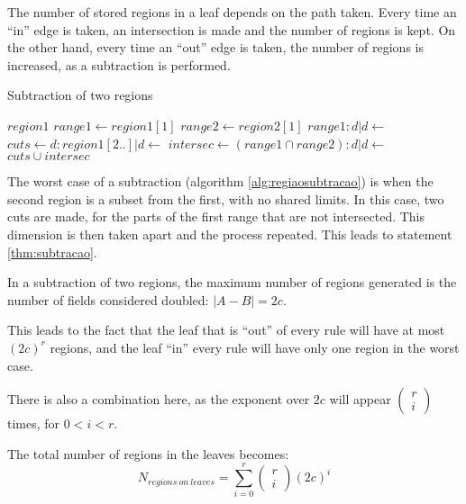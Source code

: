 The number of stored regions in a leaf depends on the path taken. Every time
an ``in'' edge is taken, an intersection is made and the number of regions is
kept. On the other hand, every time an ``out'' edge is taken, the number of
regions is increased, as a subtraction is performed.

\begin{algorithm}
	\caption{\label{alg:regiaosubtracao}Subtraction of two regions}
	\begin{algorithmic}[1]
				\State \Return $region1$
			\Else
				\State $range1 \gets region1[1]$
				\State $range2 \gets region2[1]$
					\State \Return $ range1 : d | d \gets $ 
				\Else
					\State $cuts \gets d : region1[2..] | d \gets $ 
					\State $intersec \gets (range1 \cap range2) : d | d \gets $ 
					\State \Return $cuts \cup intersec$
				\EndIf
			\EndIf
		\EndFunction
	\end{algorithmic}
\end{algorithm}

The worst case of a subtraction (algorithm \ref{alg:regiaosubtracao}) is when
the second region is a subset from the first, with no shared limits. In this case,
two cuts are made, for the parts of the first range that are not intersected.
This dimension is then taken apart and the process repeated. This leads to
statement \ref{thm:subtracao}.

\begin{mathstatement}
	\label{thm:subtracao}
	In a subtraction of two regions, the maximum number of regions generated is
	the number of fields considered doubled: $|A-B|=2c$.
\end{mathstatement}

This leads to the fact that the leaf that is ``out'' of every rule will have at
most $(2c)^r$ regions, and the leaf ``in'' every rule will have only one region
in the worst case.

There is also a combination here, as the exponent over $2c$ will appear 
$\left( \begin{array}{l}r \\ i\end{array} \right)$ times, for $0 < i < r$.

The total number of regions in the leaves becomes:
\begin{equation}
	N_{regions\ on\ leaves} = \sum_{i=0}^{r} \left( \begin{array}{l}r \\ i\end{array} \right) (2c)^i
\end{equation}

